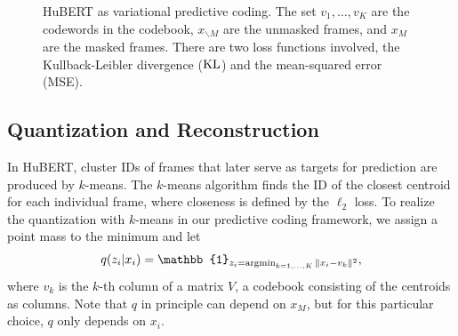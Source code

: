 \begin{figure}
\caption{HuBERT as variational predictive coding.
  The set $v_1, \dots, v_K$ are the codewords in the codebook,
  $x_{\backslash M}$ are the unmasked frames,
  and $x_M$ are the masked frames.
  There are two loss functions involved, the Kullback-Leibler divergence ($\mathrm{KL}$)
  and the mean-squared error (MSE).}
\label{fig:feedforward}
\end{figure}

\subsection{Quantization and Reconstruction}

%
In HuBERT, cluster IDs of frames that later serve as targets
for prediction are produced by $k$-means.
The $k$-means algorithm finds the ID of the closest centroid
for each individual frame, where closeness is defined by the $\ell_2$ loss.
To realize the quantization with $k$-means in our predictive coding framework,
we assign a point mass to the minimum and let
\begin{align}
q(z_i|x_i) = \mathbb{1}_{z_i = \argmin_{k=1, \dots, K} \|x_i - v_k\|^2},
\label{eq:argmin}
\end{align}
where $v_k$ is the $k$-th column of a matrix $V$, a codebook consisting of the centroids as columns.
Note that $q$ in principle can depend on $x_M$, but for this particular choice,
$q$ only depends on $x_i$.
%
%

